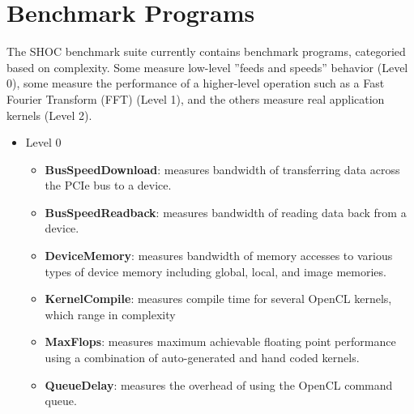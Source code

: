 \documentclass[11pt]{article}
\begin{document}
\section{Benchmark Programs}\label{sec:programs}

The SHOC benchmark suite currently contains benchmark programs, categoried
based on complexity.  Some measure low-level ''feeds and speeds'' behavior
(Level 0), some measure the performance of a higher-level operation such 
as a Fast Fourier Transform (FFT) (Level 1), and the others measure 
real application kernels (Level 2).

\newpage 

\begin{itemize}
\item Level 0
    \begin{itemize}
        \item {\bf BusSpeedDownload}: measures bandwidth of transferring data 
         across the PCIe bus to a device.
        \item {\bf BusSpeedReadback}: measures bandwidth of reading data back
        from a device.
        \item {\bf DeviceMemory}: measures bandwidth of memory accesses to 
        various types of device memory including global, local, and image 
        memories.
        \item {\bf KernelCompile}: measures compile time for several OpenCL
        kernels, which range in complexity
        \item {\bf MaxFlops}: measures maximum achievable floating point 
        performance using a combination of auto-generated and hand coded 
        kernels.
        \item {\bf QueueDelay}: measures the overhead of using the OpenCL
        command queue.
    \end{itemize}


\end{itemize}
\end{document}
